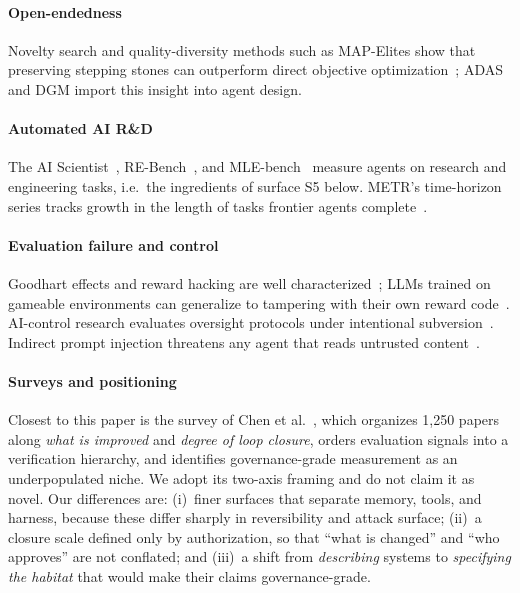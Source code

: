 \documentclass[11pt,a4paper]{article}
\begin{document}
\paragraph{Open-endedness} Novelty search and quality-diversity methods such as MAP-Elites show that preserving stepping stones can outperform direct objective optimization~\cite{lehman2011novelty,mouret2015mapelites}; ADAS and DGM import this insight into agent design.

\paragraph{Automated AI R\&D} The AI Scientist~\cite{lu2024aiscientist}, RE-Bench~\cite{wijk2024rebench}, and MLE-bench~\cite{chan2024mlebench} measure agents on research and engineering tasks, i.e.\ the ingredients of surface S5 below. METR's time-horizon series tracks growth in the length of tasks frontier agents complete~\cite{metr2026horizons}.

\paragraph{Evaluation failure and control} Goodhart effects and reward hacking are well characterized~\cite{manheim2018goodhart,skalse2022rewardhacking}; LLMs trained on gameable environments can generalize to tampering with their own reward code~\cite{denison2024subterfuge}. AI-control research evaluates oversight protocols under intentional subversion~\cite{greenblatt2023control,kutasov2025control,gardnerchallis2026monitoring}. Indirect prompt injection threatens any agent that reads untrusted content~\cite{greshake2023injection,evtimov2025wasp,zhan2026stepjack}.

\paragraph{Surveys and positioning} Closest to this paper is the survey of Chen et al.~\cite{chen2026survey}, which organizes 1,250 papers along \emph{what is improved} and \emph{degree of loop closure}, orders evaluation signals into a verification hierarchy, and identifies governance-grade measurement as an underpopulated niche. We adopt its two-axis framing and do not claim it as novel. Our differences are: (i)~finer surfaces that separate memory, tools, and harness, because these differ sharply in reversibility and attack surface; (ii)~a closure scale defined only by authorization, so that ``what is changed'' and ``who approves'' are not conflated; and (iii)~a shift from \emph{describing} systems to \emph{specifying the habitat} that would make their claims governance-grade.
\end{document}
